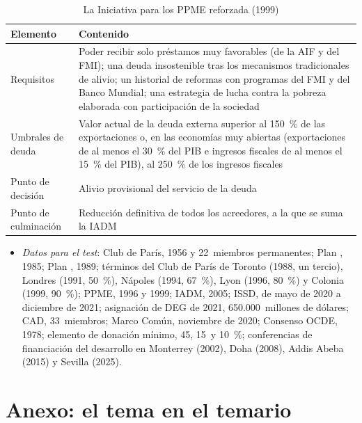 \documentclass[11pt]{article}
\begin{document}
\begin{table}[H]
\centering
\caption{La Iniciativa para los PPME reforzada (1999)}\label{tab:ppme}
\small
\begin{tabular}{>{\raggedright\arraybackslash}m{3.6cm}>{\raggedright\arraybackslash}m{10.4cm}}
\toprule
\rowcolor{tceeazulpalido} Elemento & Contenido \\
\midrule
Requisitos & Poder recibir solo préstamos muy favorables (de la AIF y del FMI); una deuda insostenible tras los mecanismos tradicionales de alivio; un historial de reformas con programas del FMI y del Banco Mundial; una estrategia de lucha contra la pobreza elaborada con participación de la sociedad \\
Umbrales de deuda & Valor actual de la deuda externa superior al 150~\% de las exportaciones o, en las economías muy abiertas (exportaciones de al menos el 30~\% del PIB e ingresos fiscales de al menos el 15~\% del PIB), al 250~\% de los ingresos fiscales \\
Punto de decisión & Alivio provisional del servicio de la deuda \\
Punto de culminación & Reducción definitiva de todos los acreedores, a la que se suma la IADM \\
\bottomrule
\end{tabular}
\end{table}

\begin{anotaciones}
\begin{itemize}
\item \emph{Datos para el test}: Club de París, 1956 y 22~miembros permanentes; Plan , 1985; Plan , 1989; términos del Club de París de Toronto (1988, un tercio), Londres (1991, 50~\%), Nápoles (1994, 67~\%), Lyon (1996, 80~\%) y Colonia (1999, 90~\%); PPME, 1996 y 1999; IADM, 2005; ISSD, de mayo de 2020 a diciembre de 2021; asignación de DEG de 2021, 650.000~millones de dólares; CAD, 33~miembros; Marco Común, noviembre de 2020; Consenso OCDE, 1978; elemento de donación mínimo, 45, 15~y 10~\%; conferencias de financiación del desarrollo en Monterrey (2002), Doha (2008), Addis Abeba (2015) y Sevilla (2025).
\end{itemize}
\end{anotaciones}

\section{Anexo: el tema en el temario}\label{anexo:temas}
\end{document}
